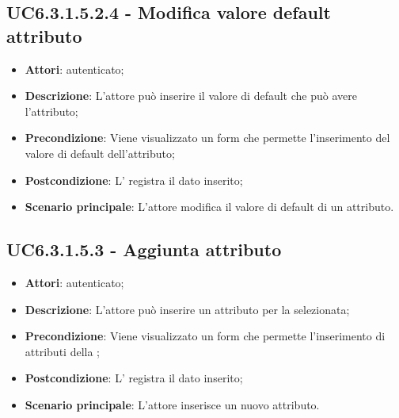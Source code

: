 \subsection{UC6.3.1.5.2.4 - Modifica valore default attributo}
\label{ssec:UC6.3.1.5.2.4}
\begin{itemize}
\item \textbf{Attori}:  autenticato;
\item \textbf{Descrizione}: L'attore può inserire il valore di default che può avere l'attributo;
\item \textbf{Precondizione}: Viene visualizzato un form che permette l'inserimento del valore di default dell'attributo;
\item \textbf{Postcondizione}: L' registra il dato inserito;
\item \textbf{Scenario principale}: L'attore modifica il valore di default di un attributo.
\end{itemize}
\subsection{UC6.3.1.5.3 - Aggiunta attributo}
\label{ssec:UC6.3.1.5.3}
\begin{itemize}
\item \textbf{Attori}:  autenticato;
\item \textbf{Descrizione}: L'attore può inserire un attributo per la  selezionata;
\item \textbf{Precondizione}: Viene visualizzato un form che permette l'inserimento di attributi della ;
\item \textbf{Postcondizione}: L' registra il dato inserito;
\item \textbf{Scenario principale}: L'attore inserisce un nuovo attributo.
\end{itemize}
